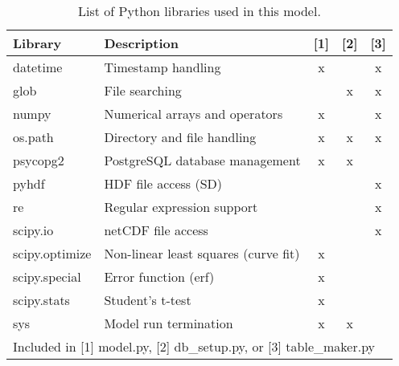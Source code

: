 \begin{table}[h]
    \caption{List of Python libraries used in this model.}
    \label{tab:pylib}
    \begin{tabular}{l p{6cm} c c c}
        \hline
        \textbf{Library} & \textbf{Description} & \textbf{[1]} & \textbf{[2]} & \textbf{[3]}\\
        \hline
        datetime & Timestamp handling & x & ~ & x \\
        
        glob & File searching & ~ & x & x \\
        
        numpy & Numerical arrays and operators & x & ~ & x\\
        
        os.path & Directory and file handling & x & x & x\\
        
        psycopg2 & PostgreSQL database management & x & x & ~\\
        
        pyhdf & HDF file access (SD) & ~ & ~ & x\\
        
        re & Regular expression support & ~ & ~ & x\\
        
        scipy.io & netCDF file access & ~ & ~ & x \\
        
        scipy.optimize & Non-linear least squares (curve fit) & x & ~ & 
        ~ \\
        
        scipy.special & Error function (erf) & x & ~ & ~ \\
        
		scipy.stats & Student's t-test & x & ~ & ~ \\

        sys & Model run termination & x & x &  ~ \\
        \hline
        \multicolumn{5}{l}{\footnotesize Included in [1] model.py, [2] db\_setup.py, or [3] table\_maker.py}
    \end{tabular}
\end{table}

